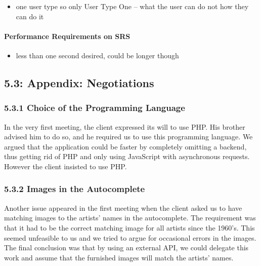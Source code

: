 \documentclass[]{article}
\begin{document}
\begin{itemize}
\itemsep1pt\parskip0pt
\item
  one user type so only User Type One -- what the user can do not how
  they can do it
\end{itemize}

\paragraph{Performance Requirements on
SRS}\label{performance-requirements-on-srs}

\begin{itemize}
\itemsep1pt\parskip0pt
\item
  less than one second desired, could be longer though
\end{itemize}

\subsection{5.3: Appendix: Negotiations}\label{appendix-negotiations}

\subsubsection{5.3.1 Choice of the Programming
Language}\label{choice-of-the-programming-language}

In the very first meeting, the client expressed its will to use PHP. His
brother advised him to do so, and he required us to use this programming
language. We argued that the application could be faster by completely
omitting a backend, thus getting rid of PHP and only using JavaScript
with asynchronous requests. However the client insisted to use PHP.

\subsubsection{5.3.2 Images in the
Autocomplete}\label{images-in-the-autocomplete}

Another issue appeared in the first meeting when the client asked us to
have matching images to the artists' names in the autocomplete. The
requirement was that it had to be the correct matching image for all
artists since the 1960's. This seemed unfeasible to us and we tried to
argue for occasional errors in the images. The final conclusion was that
by using an external API, we could delegate this work and assume that
the furnished images will match the artists' names.
\end{document}
